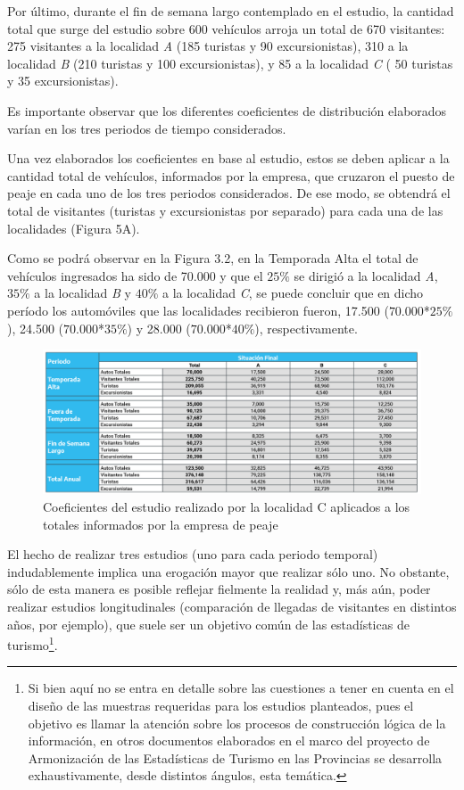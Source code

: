 \documentclass[
]{book}
\begin{document}
Por último, durante el fin de semana largo contemplado en el estudio, la cantidad total que surge del estudio sobre 600 vehículos arroja un total de 670 visitantes: 275 visitantes a la localidad \emph{A} (185 turistas y 90 excursionistas), 310 a la localidad \emph{B} (210 turistas y 100 excursionistas), y 85 a la localidad \emph{C} ( 50 turistas y 35 excursionistas).

Es importante observar que los diferentes coeficientes de distribución elaborados varían en los tres periodos de tiempo considerados.

Una vez elaborados los coeficientes en base al estudio, estos se deben aplicar a la cantidad total de vehículos, informados por la empresa, que cruzaron el puesto de peaje en cada uno de los tres periodos considerados. De ese modo, se obtendrá el total de visitantes (turistas y excursionistas por separado) para cada una de las localidades (Figura 5A).

Como se podrá observar en la Figura 3.2, en la Temporada Alta el total de vehículos ingresados ha sido de 70.000 y que el \(25\%\) se dirigió a la localidad \emph{A}, \(35\%\) a la localidad \emph{B} y \(40\%\) a la localidad \emph{C}, se puede concluir que en dicho período los automóviles que las localidades recibieron fueron, 17.500 (\(70.000\)*\(25\%\)), 24.500 (\(70.000\)*\(35\%\)) y 28.000 (\(70.000\)*\(40\%\)), respectivamente.

\begin{figure}

{\centering \includegraphics[width=1\linewidth]{imagenes/figura5A} 

}

\caption{Coeficientes del estudio realizado por la localidad C aplicados a los totales informados por la empresa de peaje}\label{fig:coeficientes}
\end{figure}

El hecho de realizar tres estudios (uno para cada periodo temporal) indudablemente implica una erogación mayor que realizar sólo uno. No obstante, sólo de esta manera es posible reflejar fielmente la realidad y, más aún, poder realizar estudios longitudinales (comparación de llegadas de visitantes en distintos años, por ejemplo), que suele ser un objetivo común de las estadísticas de turismo\footnote{Si bien aquí no se entra en detalle sobre las cuestiones a tener en cuenta en el diseño de las muestras requeridas para los estudios planteados, pues el objetivo es llamar la atención sobre los procesos de construcción lógica de la información, en otros documentos elaborados en el marco del proyecto de Armonización de las Estadísticas de Turismo en las Provincias se desarrolla exhaustivamente, desde distintos ángulos, esta temática.}.
\end{document}

